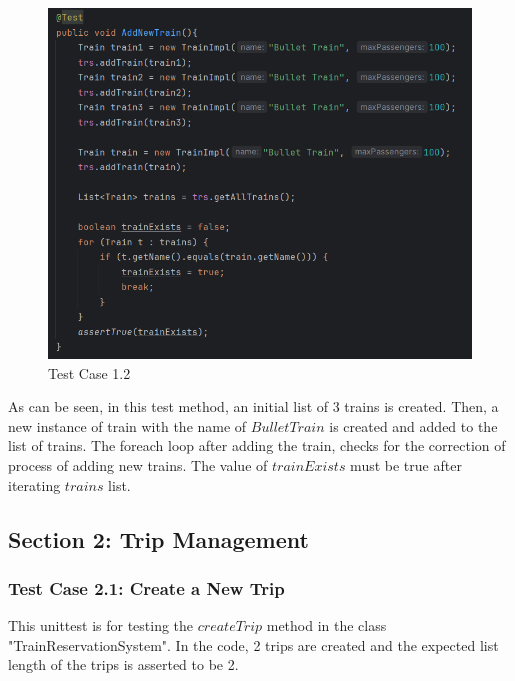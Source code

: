 \documentclass{article}
\begin{document}
\begin{figure}[h]
  \centering
  \includegraphics[width=1.0\textwidth]{pictures/T1-2.png}
  \caption{Test Case 1.2}
  \label{fig:your_label}
\end{figure}

\bigskip

As can be seen, in this test method, an initial list of 3 trains is created. Then, a new instance of train with the name of $Bullet Train$ is created and added to the list of trains. The foreach loop after adding the train, checks for the correction of process of adding new trains. The value of $trainExists$ must be true after iterating $trains$ list.

\pagebreak

\subsection{Section 2: Trip Management}
\subsubsection{Test Case 2.1: Create a New Trip}
This unittest is for testing the $createTrip$ method in the class "TrainReservationSystem". In the code, 2 trips are created and the expected list length of the trips is asserted to be 2.
\end{document}
